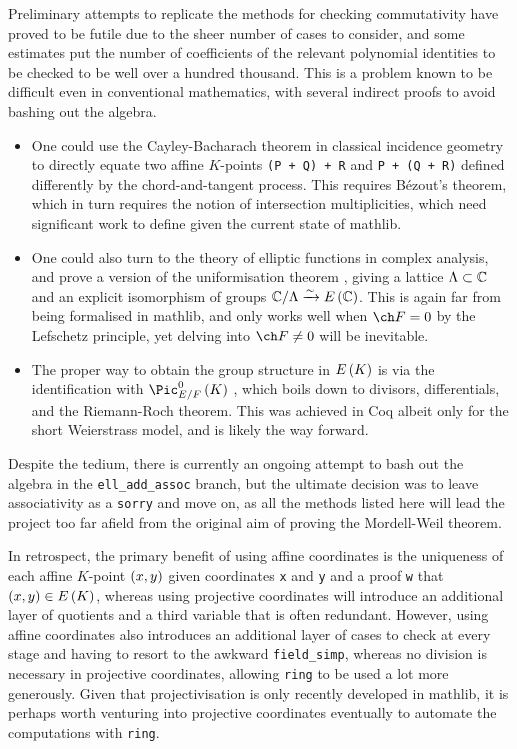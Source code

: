 Preliminary attempts to replicate the methods for checking commutativity have proved to be futile due to the sheer number of cases to consider, and some estimates put the number of coefficients of the relevant polynomial identities to be checked to be well over a hundred thousand. This is a problem known to be difficult even in conventional mathematics, with several indirect proofs to avoid bashing out the algebra.
\begin{itemize}
\item One could use the Cayley-Bacharach theorem in classical incidence geometry \cite[Lemma 7.1]{Cas91} to directly equate two affine $ K $-points \texttt{(P + Q) + R} and \texttt{P + (Q + R)} defined differently by the chord-and-tangent process. This requires B\'ezout's theorem, which in turn requires the notion of intersection multiplicities, which need significant work to define given the current state of mathlib.
\item One could also turn to the theory of elliptic functions in complex analysis, and prove a version of the uniformisation theorem \cite[Corollary VI.5.1.1]{Sil09}, giving a lattice $ \Lambda \subset \mathbb{C} $ and an explicit isomorphism of groups $ \CC / \Lambda \xrightarrow{\sim} E\br{\CC} $. This is again far from being formalised in mathlib, and only works well when $ \ch F = 0 $ by the Lefschetz principle, yet delving into $ \ch F \ne 0 $ will be inevitable.
\item The proper way to obtain the group structure in $ E\br{K} $ is via the identification with $ \Pic_{E / F}^0\br{K} $ \cite[Proposition III.3.4]{Sil09}, which boils down to divisors, differentials, and the Riemann-Roch theorem. This was achieved in Coq albeit only for the short Weierstrass model, and is likely the way forward.
\end{itemize}
Despite the tedium, there is currently an ongoing attempt to bash out the algebra in the \texttt{ell\_add\_assoc} branch, but the ultimate decision was to leave associativity as a \texttt{sorry} and move on, as all the methods listed here will lead the project too far afield from the original aim of proving the Mordell-Weil theorem.

In retrospect, the primary benefit of using affine coordinates is the uniqueness of each affine $ K $-point $ \br{x, y} $ given coordinates \texttt{x} and \texttt{y} and a proof \texttt{w} that $ \br{x, y} \in E\br{K} $, whereas using projective coordinates will introduce an additional layer of quotients and a third variable that is often redundant. However, using affine coordinates also introduces an additional layer of cases to check at every stage and having to resort to the awkward \texttt{field\_simp}, whereas no division is necessary in projective coordinates, allowing \texttt{ring} to be used a lot more generously. Given that projectivisation is only recently developed in mathlib, it is perhaps worth venturing into projective coordinates eventually to automate the computations with \texttt{ring}.

